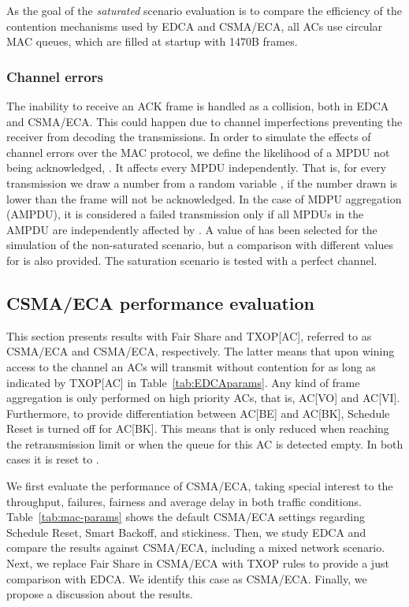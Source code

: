 \documentclass[a4paper]{article}
\begin{document}
As the goal of the \emph{saturated} scenario evaluation is to compare the efficiency of the contention mechanisms used by EDCA and CSMA/ECA, all ACs use circular MAC queues, which are filled at startup with 1470B frames.

\subsubsection{Channel errors}
The inability to receive an ACK frame is handled as a collision, both in EDCA and CSMA/ECA. This could happen due to channel imperfections preventing the receiver from decoding the transmissions. In order to simulate the effects of channel errors over the MAC protocol, we define the likelihood of a MPDU not being acknowledged, . It affects every MPDU independently. That is, for every transmission we draw a number from a random variable , if the number drawn is lower than  the frame will not be acknowledged. In the case of MDPU aggregation (AMPDU), it is considered a failed transmission only if all MPDUs in the AMPDU are independently affected by . A value of  has been selected for the simulation of the non-saturated scenario, but a comparison with different values for  is also provided. The saturation scenario is tested with a perfect channel.



\subsection{CSMA/ECA performance evaluation}\label{sim:results}
This section presents results with Fair Share and TXOP[AC], referred to as CSMA/ECA and CSMA/ECA, respectively. The latter means that upon wining access to the channel an ACs will transmit without contention for as long as indicated by TXOP[AC] in Table~\ref{tab:EDCAparams}. Any kind of frame aggregation is only performed on high priority ACs, that is, AC[VO] and AC[VI]. Furthermore, to provide differentiation between AC[BE] and AC[BK], Schedule Reset is turned off for AC[BK]. This means that  is only reduced when reaching the retransmission limit or when the queue for this AC is detected empty. In both cases it is reset to .

We first evaluate the performance of CSMA/ECA, taking special interest to the throughput, failures, fairness and average delay in both traffic conditions. Table~\ref{tab:mac-params} shows the default CSMA/ECA settings regarding Schedule Reset, Smart Backoff, and stickiness. Then, we study EDCA and compare the results against CSMA/ECA, including a mixed network scenario. Next, we replace Fair Share in CSMA/ECA with TXOP rules to provide a just comparison with EDCA. We identify this case as CSMA/ECA. Finally, we propose a discussion about the results.
\end{document}
